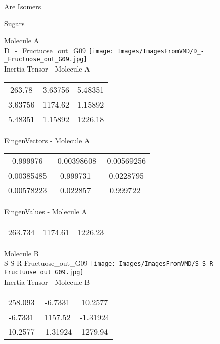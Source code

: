 \begin{center}
\vtab
\vtab
\textcolor{NavyBlue}{\Large Are Isomers}
\end{center}
\newpage

\vtab[-2cm]
\begin{center}
{\large Sugars}
\end{center}
\begin{multicols}{2}
\begin{center}
Molecule A \\ 
D\_-\_Fructuose\_out\_G09
\texttt{[image: Images/ImagesFromVMD/D\_-\_Fructuose\_out\_G09.jpg]}
\\
Inertia Tensor - Molecule A \\
\vtab
\begin{tabular}{|c c c|}
263.78	 & 	3.63756	 & 	5.48351	 \\
3.63756	 & 	1174.62	 & 	1.15892	 \\
5.48351	 & 	1.15892	 & 	1226.18
\end{tabular}

\vtab
 EingenVectors - Molecule A     \\
\vtab
\begin{tabular}{|c c c|}
0.999976	 & 	-0.00398608	 & 	-0.00569256	 \\
0.00385485	 & 	0.999731	 & 	-0.0228795	 \\
0.00578223	 & 	0.022857	 & 	0.999722
\end{tabular}

\vtab
 EingenValues - Molecule A     \\
\vtab
\begin{tabular}{|c c c|}
263.734	 & 	1174.61	 & 	1226.23
\end{tabular}
\columnbreak

Molecule B \\ 
S-S-R-Fructuose\_out\_G09
\texttt{[image: Images/ImagesFromVMD/S-S-R-Fructuose\_out\_G09.jpg]}
\\
Inertia Tensor - Molecule B \\
\vtab
\begin{tabular}{|c c c|}
258.093	 & 	-6.7331	 & 	10.2577	 \\
-6.7331	 & 	1157.52	 & 	-1.31924	 \\
10.2577	 & 	-1.31924	 & 	1279.94
\end{tabular}


\end{center}
\end{multicols}
